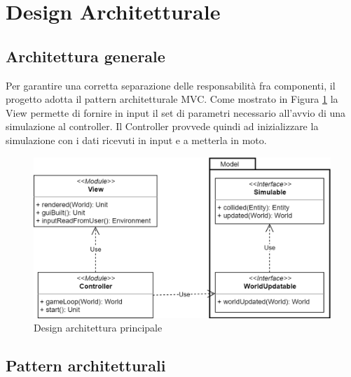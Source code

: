 \section{Design Architetturale}

\subsection{Architettura generale}
Per garantire una corretta separazione delle responsabilità fra componenti, il progetto adotta il pattern architetturale MVC. Come mostrato in Figura \ref{fig:mainarchitecture} la View permette di fornire in input il set di parametri necessario all'avvio di una simulazione al controller. Il Controller provvede quindi ad inizializzare la simulazione con i dati ricevuti in input e a metterla in moto.

\begin{figure}[h!]
\centering
\includegraphics[width=\textwidth, scale=0.44]{img/MainArchitecture.png}
\caption{Design architettura principale}
\label{fig:mainarchitecture}
\end{figure}

\subsection{Pattern architetturali}